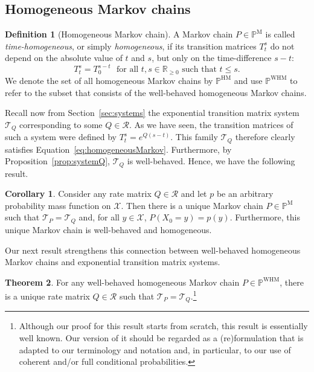 \documentclass[10pt,a4paper]{paper}
\theoremstyle{definition}
\newtheorem{theorem}{Theorem}[section]
\newtheorem{corollary}[theorem]{Corollary}
\newtheorem{definition}{Definition}
\newcommand{\reals}{\mathbb{R}}
\newcommand{\realsnonneg}{\reals_{\geq 0}}
\newcommand{\states}{\mathcal{X}}
\newcommand{\processes}{\mathbb{P}}
\newcommand{\mprocesses}{\processes^{\mathrm{M}}}
\newcommand{\hmprocesses}{\processes^{\mathrm{HM}}}
\newcommand{\whmprocesses}{\processes^{\mathrm{WHM}}}
\begin{document}
\subsection{Homogeneous Markov chains}\label{sec:homogen_markov_chain}

\begin{definition}[Homogeneous Markov chain]\label{def:homogeneousMarkov}
A Markov chain $P\in\mprocesses$ is called \emph{time-homogeneous}, or simply \emph{homogeneous}, if its transition matrices $T_t^s$ do not depend on the absolute value of $t$ and $s$, but only on the time-difference $s-t$:
\begin{equation}\label{eq:homogeneousMarkov}
T_t^s=T_0^{s-t}
\text{~~for all $t,s\in\realsnonneg$ such that $t\leq s$.}
\end{equation}
We denote the set of all homogeneous Markov chains by $\hmprocesses$ and use $\whmprocesses$ to refer to the subset that consists of the well-behaved homogeneous Markov chains.
\end{definition}

Recall now from Section~\ref{sec:systems} the exponential transition matrix system $\mathcal{T}_Q$ corresponding to some $Q\in\mathcal{R}$. As we have seen, the transition matrices of such a system were defined by $T_t^s = e^{Q(s-t)}$. This family $\mathcal{T}_Q$ therefore clearly satisfies Equation~\ref{eq:homogeneousMarkov}. Furthermore, by Proposition~\ref{prop:systemQ}, $\mathcal{T}_Q$ is well-behaved. Hence, we have the following result.

\begin{corollary}\label{cor:rate_has_unique_homogen_markov_process}
Consider any rate matrix $Q\in\mathcal{R}$ and let $p$ be an arbitrary probability mass function on $\states$. Then there is a unique Markov chain $P\in\mprocesses$ such that $\mathcal{T}_P=\mathcal{T}_Q$ and, for all $y\in\mathcal{X}$, $P(X_0=y)=p(y)$. Furthermore, this unique Markov chain is well-behaved and homogeneous.
\end{corollary}

Our next result strengthens this connection between well-behaved homogeneous Markov chains and exponential transition matrix systems.

\begin{theorem}\label{theo:homogeneoushasQ}
For any well-behaved homogeneous Markov chain $P\in\whmprocesses$, there is a unique rate matrix $Q\in\mathcal{R}$ such that $\mathcal{T}_P=\mathcal{T}_Q$.\footnote{Although our proof for this result starts from scratch, this result is essentially well known. Our version of it should be regarded as a (re)formulation that is adapted to our terminology and notation and, in particular, to our use of coherent and/or full conditional probabilities.}
\end{theorem}
\end{document}
